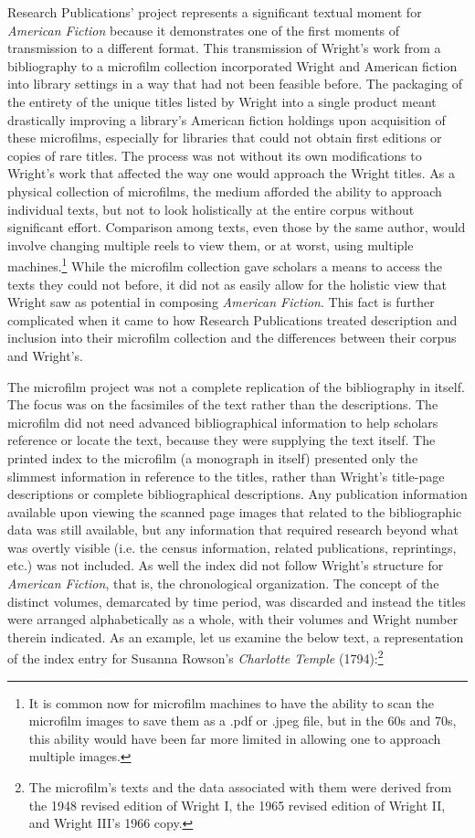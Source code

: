 Research Publications' project represents a significant textual moment for \textit{American Fiction} because it demonstrates one of the first moments of transmission to a different format. This transmission of Wright's work from a bibliography to a microfilm collection incorporated Wright and American fiction into library settings in a way that had not been feasible before. The packaging of the entirety of the unique titles listed by Wright into a single product meant drastically improving a library's American fiction holdings upon acquisition of these microfilms, especially for libraries that could not obtain first editions or copies of rare titles. The process was not without its own modifications to Wright's work that affected the way one would approach the Wright titles. As a physical collection of microfilms, the medium afforded the ability to approach individual texts, but not to look holistically at the entire corpus without significant effort. Comparison among texts, even those by the same author, would involve changing multiple reels to view them, or at worst, using multiple machines.\footnote{It is common now for microfilm machines to have the ability to scan the microfilm images to save them as a .pdf or .jpeg file, but in the 60s and 70s, this ability would have been far more limited in allowing one to approach multiple images.} While the microfilm collection gave scholars a means to access the texts they could not before, it did not as easily allow for the holistic view that Wright saw as potential in composing \textit{American Fiction}. This fact is further complicated when it came to how Research Publications treated description and inclusion into their microfilm collection and the differences between their corpus and Wright's.

The microfilm project was not a complete replication of the bibliography in itself. The focus was on the facsimiles of the text rather than the descriptions. The microfilm did not need advanced bibliographical information to help scholars reference or locate the text, because they were supplying the text itself. The printed index to the microfilm (a monograph in itself) presented only the slimmest information in reference to the titles, rather than Wright's title-page descriptions or complete bibliographical descriptions. Any publication information available upon viewing the scanned page images that related to the bibliographic data was still available, but any information that required research beyond what was overtly visible (i.e. the census information, related publications, reprintings, etc.) was not included. As well the index did not follow Wright's structure for \textit{American Fiction}, that is, the chronological organization. The concept of the distinct volumes, demarcated by time period, was discarded and instead the titles were arranged alphabetically as a whole, with their volumes and Wright number therein indicated. As an example, let us examine the below text, a representation of the index entry for Susanna Rowson's \textit{Charlotte Temple} (1794):\footnote{The microfilm's texts and the data associated with them were derived from the 1948 revised edition of Wright I, the 1965 revised edition of Wright II, and Wright III's 1966 copy.}

